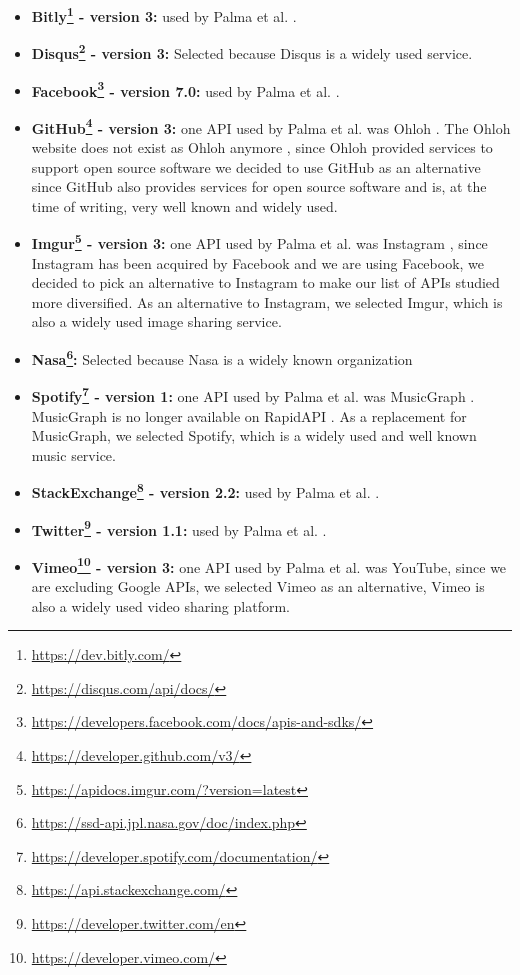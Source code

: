 \begin{itemize}
\label{APIsusedintheresearch}
    \item \textbf{Bitly\footnote{\url{https://dev.bitly.com/}} - version 3:} used by Palma et al. \cite{linguistic}.
    \item \textbf{Disqus\footnote{\url{https://disqus.com/api/docs/}} - version 3:} Selected because Disqus  is  a  widely used service.
    \item \textbf{Facebook\footnote{\url{https://developers.facebook.com/docs/apis-and-sdks/}} - version 7.0:} used by Palma et al. \cite{linguistic}.
    \item \textbf{GitHub\footnote{\url{https://developer.github.com/v3/}} - version 3:} one API used by Palma et al. was Ohloh \cite{linguistic}. The Ohloh website does not exist as Ohloh anymore \cite{ohloh}, since Ohloh provided services to support open source software \cite{ohloh} we decided to use GitHub as an alternative since GitHub also provides services for open source software and is, at the time of writing, very well known and widely used. 
    \item \textbf{Imgur\footnote{\url{https://apidocs.imgur.com/?version=latest}} - version 3:} one API used by Palma et al. was Instagram \cite{linguistic}, since Instagram has been acquired by Facebook and we are using Facebook, we decided to pick an alternative to Instagram to make our list of APIs studied more diversified. As an alternative to Instagram, we selected Imgur, which is also a widely used image sharing service.
    \item \textbf{Nasa\footnote{\url{https://ssd-api.jpl.nasa.gov/doc/index.php}}:} Selected because Nasa is a widely known organization
    \item \textbf{Spotify\footnote{\url{https://developer.spotify.com/documentation/}} - version 1:} one API used by Palma et al. was MusicGraph \cite{linguistic}. MusicGraph is no longer available on RapidAPI \cite{musicrapid}. As a replacement for MusicGraph, we selected Spotify, which is a widely used and well known music service. 
    \item \textbf{StackExchange\footnote{\url{https://api.stackexchange.com/}} - version 2.2:} used by Palma et al. \cite{linguistic}.
    \item \textbf{Twitter\footnote{\url{https://developer.twitter.com/en}} - version 1.1:} used by Palma et al. \cite{linguistic}.
    \item \textbf{Vimeo\footnote{\url{https://developer.vimeo.com/}} - version 3:} one API used by Palma et al. \cite{linguistic} was YouTube, since we are excluding Google APIs, we selected Vimeo as an alternative, Vimeo is also a widely used video sharing platform. 
\end{itemize}

